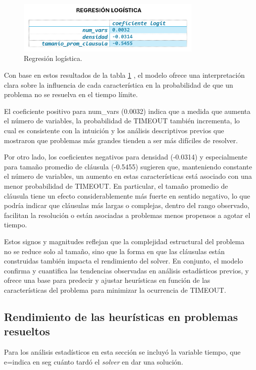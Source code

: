 \begin{figure}[ht]
    \centering
    \includegraphics[width=0.8\textwidth]{Graphics/regresion_logistica.png}
    \caption{Regresi\'on log\'istica.}
    \label{fig:regresion-logistica}
\end{figure}

Con base en estos resultados de la tabla \ref{fig:regresion-logistica} , el modelo ofrece una interpretación clara sobre la influencia de cada característica en la probabilidad de que un problema no se resuelva en el tiempo límite.

El coeficiente positivo para num\_vars (0.0032) indica que a medida que aumenta el número de variables, la probabilidad de TIMEOUT también incrementa, lo cual es consistente con la intuición y los análisis descriptivos previos que mostraron que problemas más grandes tienden a ser más difíciles de resolver. 

Por otro lado, los coeficientes negativos para densidad (-0.0314) y especialmente para tamaño promedio de cláusula (-0.5455) sugieren que, manteniendo constante el número de variables, un aumento en estas características está asociado con una menor probabilidad de TIMEOUT. En particular, el tamaño promedio de cláusula tiene un efecto considerablemente más fuerte en sentido negativo, lo que podría indicar que cláusulas más largas o complejas, dentro del rango observado, facilitan la resolución o están asociadas a problemas menos propensos a agotar el tiempo.

Estos signos y magnitudes reflejan que la complejidad estructural del problema no se reduce solo al tamaño, sino que la forma en que las cláusulas están construidas también impacta el rendimiento del solver. En conjunto, el modelo confirma y cuantifica las tendencias observadas en análisis estadísticos previos, y ofrece una base para predecir y ajustar heurísticas en función de las características del problema para minimizar la ocurrencia de TIMEOUT.

\subsection{Rendimiento de las heur\'isticas en problemas resueltos}
Para los an\'alisis estad\'isticos en esta secci\'on se incluy\'o la variable tiempo, que e=indica en seg cu\'anto tard\'o el \textit{solver} en dar una soluci\'on.

